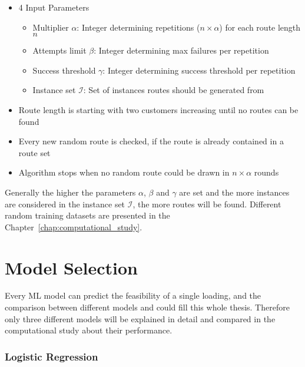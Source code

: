 \begin{itemize}
    \item 4 Input Parameters
          \begin{itemize}
              \item Multiplier $\alpha$: Integer determining repetitions ($n\times\alpha$) for each route length $n$
              \item  Attempts limit $\beta$: Integer determining max failures per repetition
              \item  Success threshold $\gamma$: Integer determining success threshold per repetition
              \item Instance set $\mathcal{I}$: Set of instances routes should be generated from
          \end{itemize}
    \item Route length is starting with two customers increasing until no routes can be found
    \item Every new random route is checked, if the route is already contained in a route set
    \item Algorithm stops when no random route could be drawn in $n \times \alpha$ rounds
\end{itemize}

Generally the higher the parameters $\alpha$, $\beta$ and $\gamma$ are set and the more instances
are considered in the instance set $\mathcal{I}$, the more routes will be found. Different
random training datasets are presented in the Chapter~\ref{chap:computational_study}.

\section{Model Selection}
\label{sec:modelselection}
Every \gls{ML} model can predict the feasibility of a single loading, and the comparison between different models and
could fill this whole thesis. Therefore only three different models will be explained in detail and compared in the computational
study about their performance.

\subsubsection{Logistic Regression}

